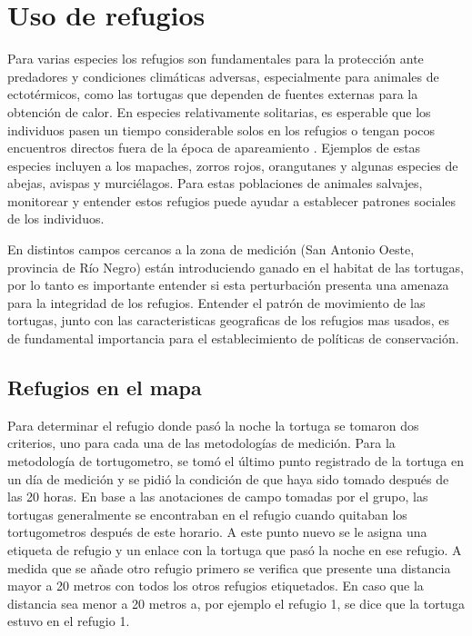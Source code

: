 \chapter{Uso de refugios}
Para varias especies los refugios son fundamentales para la protección ante predadores y  condiciones climáticas adversas, especialmente para animales de ectotérmicos, como las tortugas que dependen de fuentes externas para la obtención de calor. En especies relativamente solitarias, es esperable que los individuos pasen un tiempo considerable solos en los refugios o tengan pocos encuentros directos fuera de la época de apareamiento \cite{bipartitasTortusPaper}. Ejemplos de estas especies incluyen a los mapaches, zorros rojos, orangutanes y algunas especies de abejas, avispas y murciélagos. Para estas poblaciones de animales salvajes, monitorear y entender estos refugios puede ayudar a establecer patrones sociales de los individuos.
 
En distintos campos cercanos a la zona de medición (San Antonio Oeste, provincia de Río Negro) están introduciendo ganado en el habitat de las tortugas, por lo tanto es importante entender si esta perturbación presenta una amenaza para la integridad de los refugios. Entender el patrón de movimiento  de las tortugas, junto con las caracteristicas geograficas de los refugios mas usados, es de fundamental importancia para el establecimiento de políticas de conservación.
 
\section{Refugios en el mapa}
Para determinar el refugio donde pasó la noche la tortuga se tomaron dos criterios, uno para cada una de las metodologías de medición. Para la metodología de tortugometro, se tomó el último punto registrado de la tortuga en un día de medición y se pidió la condición de que haya sido tomado después de las 20 horas. En base a las anotaciones de campo tomadas por el grupo, las tortugas generalmente  se encontraban en el refugio cuando quitaban los tortugometros después de este horario. A este punto nuevo se le asigna una etiqueta de refugio y un enlace con la tortuga que pasó la noche en ese refugio. A medida que se añade otro refugio primero se verifica que presente una distancia mayor a 20 metros con todos los otros refugios etiquetados. En caso que la distancia sea menor a 20 metros a, por ejemplo el refugio 1, se dice que la tortuga estuvo en el refugio 1.
 
